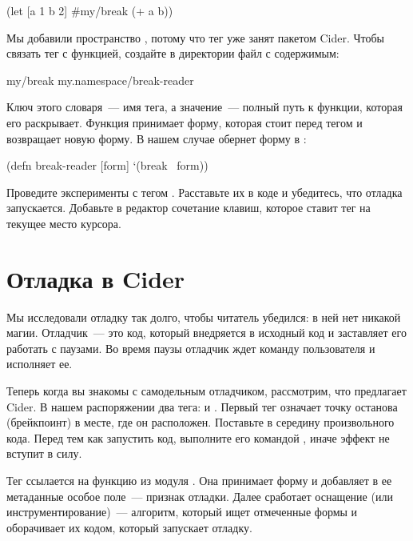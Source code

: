 \begin{english}
  \begin{clojure}
(let [a 1 b 2]
  #my/break (+ a b))
  \end{clojure}
\end{english}

Мы добавили пространство , потому что тег  уже занят пакетом Cider. Чтобы связать тег с функцией, создайте в директории  файл  с содержимым:

\begin{english}
  \begin{clojure}
{my/break my.namespace/break-reader}
  \end{clojure}
\end{english}

Ключ этого словаря~--- имя тега, а значение~--- полный путь к функции, которая его раскрывает. Функция принимает форму, которая стоит перед тегом и возвращает новую форму. В нашем случае  обернет форму в :

\begin{english}
  \begin{clojure}
(defn break-reader [form]
  `(break ~form))
  \end{clojure}
\end{english}

Проведите эксперименты с тегом . Расставьте их в коде и убедитесь, что отладка запускается. Добавьте в редактор сочетание клавиш, которое ставит тег на текущее место курсора.

\section{Отладка в Cider}

Мы исследовали отладку так долго, чтобы читатель убедился: в ней нет никакой магии. Отладчик~--- это код, который внедряется в исходный код и заставляет его работать с паузами. Во время паузы отладчик ждет команду пользователя и исполняет ее.

Теперь когда вы знакомы с самодельным отладчиком, рассмотрим, что предлагает Cider. В нашем распоряжении два тега:  и . Первый тег означает точку останова (брейкпоинт) в месте, где он расположен. Поставьте  в середину произвольного кода. Перед тем как запустить код, выполните его командой , иначе эффект не вступит в силу.

Тег  ссылается на функцию  из модуля . Она принимает форму и добавляет в ее метаданные особое поле~--- признак отладки. Далее сработает оснащение (или инструментирование)~--- алгоритм, который ищет отмеченные формы и оборачивает их кодом, который запускает отладку.

